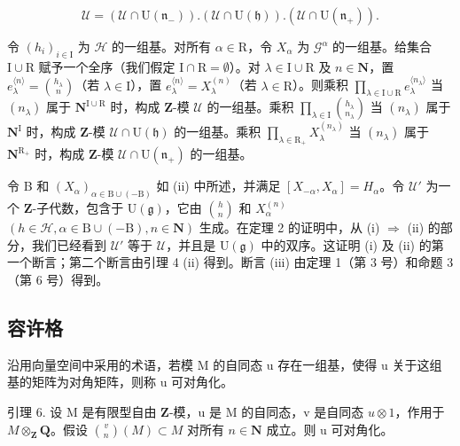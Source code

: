 \[
\mathcal {U} = (\mathcal {U} \cap \mathrm{U} (\mathfrak {n} _ {-})). (\mathcal {U} \cap \mathrm{U} (\mathfrak {h})). (\mathcal {U} \cap \mathrm{U} (\mathfrak {n} _ {+})).
\]

令 \((h_i)_{i\in \mathrm{I}}\) 为 \(\mathcal{H}\) 的一组基。对所有 \(\alpha \in \mathrm{R}\)，令 \(X_{\alpha}\) 为 \(\mathcal{G}^{\alpha}\) 的一组基。给集合 \(\mathrm{I}\cup \mathrm{R}\) 赋予一个全序（我们假定 \(\mathrm{I}\cap \mathrm{R} = \emptyset\)）。对 \(\lambda \in \mathrm{I}\cup \mathrm{R}\) 及 \(n\in \mathbf{N}\)，置 \(e_{\lambda}^{\langle n\rangle} = \binom{h_{\lambda}}{n}\)（若 \(\lambda \in \mathrm{I}\)），置 \(e_{\lambda}^{\langle n\rangle} = X_{\lambda}^{(n)}\)（若 \(\lambda \in \mathrm{R}\)）。则乘积 \(\prod_{\lambda \in \mathrm{I}\cup \mathrm{R}}e_{\lambda}^{\langle n_{\lambda}\rangle}\) 当 \((n_{\lambda})\) 属于 \(\mathbf{N}^{\mathrm{I}\cup \mathrm{R}}\) 时，构成 \(\mathbf{Z}\)-模 \(\mathcal{U}\) 的一组基。乘积 \(\prod_{\lambda \in \mathrm{I}}\binom{h_{\lambda}}{n_{\lambda}}\) 当 \((n_{\lambda})\) 属于 \(\mathbf{N}^{\mathrm{I}}\) 时，构成 \(\mathbf{Z}\)-模 \(\mathcal{U}\cap \mathrm{U}(\mathfrak{h})\) 的一组基。乘积 \(\prod_{\lambda \in \mathrm{R}_{+}}X_{\lambda}^{(n_{\lambda})}\) 当 \((n_{\lambda})\) 属于 \(\mathbf{N}^{\mathrm{R}_{+}}\) 时，构成 \(\mathbf{Z}\)-模 \(\mathcal{U}\cap \mathrm{U}(\mathfrak{n}_{+})\) 的一组基。

令 B 和 \((X_{\alpha})_{\alpha\in\mathrm{B}\cup(-\mathrm{B})}\) 如 (ii) 中所述，并满足 \([X_{-\alpha},X_{\alpha}]=H_{\alpha}\)。令 \(\mathcal{U}'\) 为一个 \(\mathbf{Z}\)-子代数，包含于 \(\mathrm{U}(\mathfrak{g})\)，它由 \(\binom{h}{n}\) 和 \(X_{\alpha}^{(n)}\) \((h\in\mathcal{H},\alpha\in\mathrm{B}\cup(-\mathrm{B}),n\in\mathbf{N})\) 生成。在定理 2 的证明中，从 (i) \(\Longrightarrow\) (ii) 的部分，我们已经看到 \(\mathcal{U}'\) 等于 \(\mathcal{U}\)，并且是 \(\mathrm{U}(\mathfrak{g})\) 中的双序。这证明 (i) 及 (ii) 的第一个断言；第二个断言由引理 4 (ii) 得到。断言 (iii) 由定理 1（第 3 号）和命题 3（第 6 号）得到。

\subsection{容许格}

沿用向量空间中采用的术语，若模 M 的自同态 u 存在一组基，使得 u 关于这组基的矩阵为对角矩阵，则称 u 可对角化。

引理 6. 设 M 是有限型自由 \(\mathbf{Z}\)-模，u 是 M 的自同态，v 是自同态 \(u \otimes 1\)，作用于 \(M \otimes_{\mathbf{Z}} \mathbf{Q}\)。假设 \(\binom{v}{n}(M) \subset M\) 对所有 \(n \in \mathbf{N}\) 成立。则 u 可对角化。

